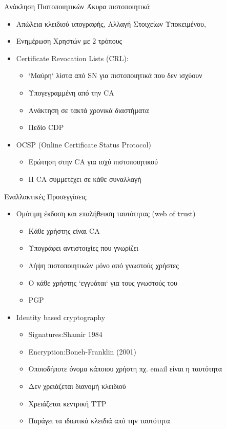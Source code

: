 \documentclass[handout]{beamer}
\begin{document}
\begin{frame}{Ανάκληση Πιστοποιητικών}
Άκυρα πιστοποιητικά
\begin{itemize}
\item Απώλεια κλειδιού υπογραφής, Αλλαγή Στοιχείων Υποκειμένου, 
\pause
\item Ενημέρωση Χρηστών με 2 τρόπους
\pause
\item Certificate Revocation Lists (CRL): 
\begin{itemize}
    \item `Μαύρη` λίστα από SN για πιστοποιητικά που δεν ισχύουν
    \item Υπογεγραμμένη από την CA
    \item Ανάκτηση σε τακτά χρονικά διαστήματα
    \item Πεδίο CDP 
\end{itemize}
\pause
\item OCSP (Online Certificate Status Protocol)
\begin{itemize}
    \item Ερώτηση στην CA για ισχύ πιστοποιητικού
    \item H CA συμμετέχει σε κάθε συναλλαγή
\end{itemize}
\end{itemize}
\end{frame}

\begin{frame}[allowframebreaks]{Εναλλακτικές Προσεγγίσεις}
\begin{itemize}
\item Ομότιμη έκδοση και επαλήθευση ταυτότητας (web of trust)
\begin{itemize}
    \item Κάθε χρήστης είναι CA
    \item Υπογράφει αντιστοιχίες που γνωρίζει
    \item Λήψη πιστοποιητικών μόνο από γνωστούς χρήστες
    \item O κάθε χρήστης `εγγυάται` για τους γνωστούς του
    \item PGP
\end{itemize}
\framebreak
\item Identity based cryptography 
\begin{itemize}
    \item Signatures:Shamir 1984
    \item Encryption:Boneh-Franklin (2001)
    \item Οποιοδήποτε όνομα κάποιου χρήστη πχ. email είναι η ταυτότητα
    \item Δεν χρειάζεται διανομή κλειδιού
    \item Χρειάζεται κεντρική TTP 
    \item Παράγει τα ιδιωτικά κλειδιά από την ταυτότητα
\end{itemize}
\end{itemize}
\end{frame}
\end{document}
